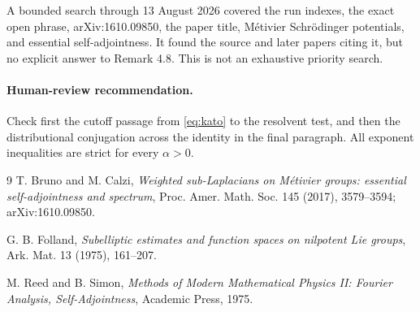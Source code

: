 \documentclass[11pt]{article}
\begin{document}
A bounded search through 13 August 2026 covered the run indexes, the exact
open phrase, arXiv:1610.09850, the paper title, M\'etivier Schr\"odinger
potentials, and essential self-adjointness.  It found the source and later
papers citing it, but no explicit answer to Remark 4.8.  This is not an
exhaustive priority search.

\paragraph{Human-review recommendation.}
Check first the cutoff passage from \eqref{eq:kato} to the resolvent test, and
then the distributional conjugation across the identity in the final
paragraph.  All exponent inequalities are strict for every $\alpha>0$.

\begin{thebibliography}{9}
T. Bruno and M. Calzi,
\emph{Weighted sub-Laplacians on M\'etivier groups: essential
self-adjointness and spectrum},
Proc. Amer. Math. Soc. 145 (2017), 3579--3594;
arXiv:1610.09850.

G. B. Folland,
\emph{Subelliptic estimates and function spaces on nilpotent Lie groups},
Ark. Mat. 13 (1975), 161--207.

M. Reed and B. Simon,
\emph{Methods of Modern Mathematical Physics II: Fourier Analysis,
Self-Adjointness}, Academic Press, 1975.
\end{thebibliography}
\end{document}
